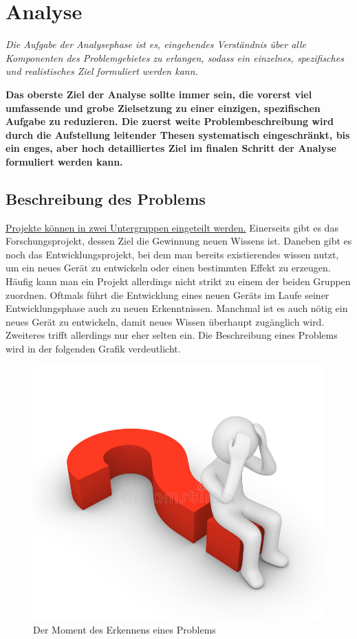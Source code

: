 \section{Analyse} \label{chap:analyse}

\textit{Die Aufgabe der Analysephase ist es, eingehendes Verständnis über alle Komponenten des Problemgebietes 
zu erlangen, sodass ein einzelnes, spezifisches und realistisches Ziel formuliert werden kann.}

\textbf{Das oberste Ziel der Analyse sollte immer sein, die vorerst viel umfassende und grobe Zielsetzung zu 
einer einzigen, spezifischen Aufgabe zu reduzieren. Die zuerst weite Problembeschreibung wird durch 
die Aufstellung leitender Thesen systematisch eingeschränkt, bis ein enges, aber hoch detailliertes 
Ziel im finalen Schritt der Analyse formuliert werden kann.}

    \subsection{Beschreibung des Problems}

    \underline{Projekte können in zwei Untergruppen eingeteilt werden.} Einerseits gibt es das Forschungsprojekt, 
    dessen Ziel die Gewinnung neuen Wissens ist. Daneben gibt es noch das Entwicklungsprojekt, bei dem 
    man bereits existierendes wissen nutzt, um ein neues Gerät zu entwickeln oder einen bestimmten 
    Effekt zu erzeugen. Häufig kann man ein Projekt allerdings nicht strikt zu einem der beiden 
    Gruppen zuordnen. Oftmals führt die Entwicklung eines neuen Geräts im Laufe seiner Entwicklungsphase 
    auch zu neuen Erkenntnissen. Manchmal ist es auch nötig ein neues Gerät zu entwickeln, damit neues 
    Wissen überhaupt zugänglich wird. Zweiteres trifft allerdings nur eher selten ein.
    Die Beschreibung eines Problems wird in der folgenden Grafik verdeutlicht.

    \begin{figure}[H]
        \centering
        \includegraphics[width=0.5\linewidth]{graphics/problem.jpg}
        \caption[Problemerkennung]{Der Moment des Erkennens eines Problems}

        
        \label{fig:problemloesung}
    \end{figure}

